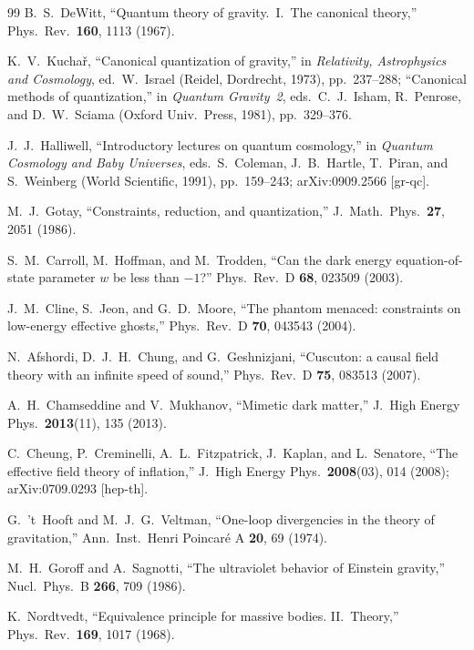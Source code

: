 \documentclass[aps,prd,onecolumn,superscriptaddress,nofootinbib,showpacs,12pt,notitlepage]{revtex4-2}
\begin{document}
\begin{thebibliography}{99}
  B.~S.~DeWitt,
  ``Quantum theory of gravity.\ I.\ The canonical theory,''
  Phys.\ Rev.\ \textbf{160}, 1113 (1967).

  K.~V.~Kucha\v{r},
  ``Canonical quantization of gravity,''
  in \textit{Relativity, Astrophysics and Cosmology},
  ed.~W.~Israel (Reidel, Dordrecht, 1973), pp.~237--288;
  ``Canonical methods of quantization,''
  in \textit{Quantum Gravity~2}, eds.~C.~J.~Isham,
  R.~Penrose, and D.~W.~Sciama
  (Oxford Univ.\ Press, 1981), pp.~329--376.

  J.~J.~Halliwell,
  ``Introductory lectures on quantum cosmology,''
  in \textit{Quantum Cosmology and Baby Universes},
  eds.~S.~Coleman, J.~B.~Hartle, T.~Piran, and
  S.~Weinberg (World Scientific, 1991), pp.~159--243;
  arXiv:0909.2566 [gr-qc].

  M.~J.~Gotay,
  ``Constraints, reduction, and quantization,''
  J.~Math.\ Phys.\ \textbf{27}, 2051 (1986).

  S.~M.~Carroll, M.~Hoffman, and M.~Trodden,
  ``Can the dark energy equation-of-state parameter $w$
  be less than $-1$?''
  Phys.\ Rev.\ D \textbf{68}, 023509 (2003).

  J.~M.~Cline, S.~Jeon, and G.~D.~Moore,
  ``The phantom menaced: constraints on low-energy
  effective ghosts,''
  Phys.\ Rev.\ D \textbf{70}, 043543 (2004).

  N.~Afshordi, D.~J.~H.~Chung, and G.~Geshnizjani,
  ``Cuscuton: a causal field theory with an infinite
  speed of sound,''
  Phys.\ Rev.\ D \textbf{75}, 083513 (2007).

  A.~H.~Chamseddine and V.~Mukhanov,
  ``Mimetic dark matter,''
  J.\ High Energy Phys.\ \textbf{2013}(11), 135 (2013).

  C.~Cheung, P.~Creminelli, A.~L.~Fitzpatrick,
  J.~Kaplan, and L.~Senatore,
  ``The effective field theory of inflation,''
  J.\ High Energy Phys.\ \textbf{2008}(03), 014 (2008);
  arXiv:0709.0293 [hep-th].

  G.~'t~Hooft and M.~J.~G.~Veltman,
  ``One-loop divergencies in the theory of gravitation,''
  Ann.\ Inst.\ Henri Poincar\'e A \textbf{20}, 69 (1974).

  M.~H.~Goroff and A.~Sagnotti,
  ``The ultraviolet behavior of Einstein gravity,''
  Nucl.\ Phys.\ B \textbf{266}, 709 (1986).

  K.~Nordtvedt,
  ``Equivalence principle for massive bodies.
  II.~Theory,''
  Phys.\ Rev.\ \textbf{169}, 1017 (1968).

\end{thebibliography}
\end{document}
